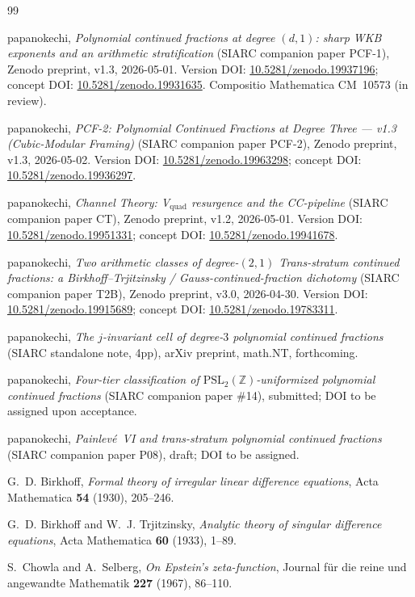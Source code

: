 \documentclass[11pt,a4paper]{article}
\theoremstyle{definition}
\theoremstyle{remark}
\newcommand{\PSLZ}{\mathrm{PSL}_2(\mathbb{Z})}
\begin{document}
\begin{thebibliography}{99}

papanokechi,
\emph{Polynomial continued fractions at degree $(d,1)$: sharp WKB exponents and an arithmetic stratification}
(SIARC companion paper PCF-1),
Zenodo preprint, v1.3, 2026-05-01.
Version DOI: \href{https://doi.org/10.5281/zenodo.19937196}{10.5281/zenodo.19937196};
concept DOI: \href{https://doi.org/10.5281/zenodo.19931635}{10.5281/zenodo.19931635}.
Compositio Mathematica CM~10573 (in review).

papanokechi,
\emph{PCF-2: Polynomial Continued Fractions at Degree Three --- v1.3 (Cubic-Modular Framing)}
(SIARC companion paper PCF-2),
Zenodo preprint, v1.3, 2026-05-02.
Version DOI: \href{https://doi.org/10.5281/zenodo.19963298}{10.5281/zenodo.19963298};
concept DOI: \href{https://doi.org/10.5281/zenodo.19936297}{10.5281/zenodo.19936297}.

papanokechi,
\emph{Channel Theory: V$_{\mathrm{quad}}$ resurgence and the CC-pipeline}
(SIARC companion paper CT),
Zenodo preprint, v1.2, 2026-05-01.
Version DOI: \href{https://doi.org/10.5281/zenodo.19951331}{10.5281/zenodo.19951331};
concept DOI: \href{https://doi.org/10.5281/zenodo.19941678}{10.5281/zenodo.19941678}.

papanokechi,
\emph{Two arithmetic classes of degree-$(2,1)$ Trans-stratum continued fractions: a Birkhoff--Trjitzinsky / Gauss-continued-fraction dichotomy}
(SIARC companion paper T2B),
Zenodo preprint, v3.0, 2026-04-30.
Version DOI: \href{https://doi.org/10.5281/zenodo.19915689}{10.5281/zenodo.19915689};
concept DOI: \href{https://doi.org/10.5281/zenodo.19783311}{10.5281/zenodo.19783311}.

papanokechi,
\emph{The $j$-invariant cell of degree-$3$ polynomial continued fractions} (SIARC standalone note, 4pp),
arXiv preprint, math.NT, forthcoming.

papanokechi,
\emph{Four-tier classification of $\PSLZ$-uniformized polynomial continued fractions}
(SIARC companion paper \#14),
submitted; DOI to be assigned upon acceptance.

papanokechi,
\emph{Painlev\'e~VI and trans-stratum polynomial continued fractions}
(SIARC companion paper P08),
draft; DOI to be assigned.

G.~D. Birkhoff,
\emph{Formal theory of irregular linear difference equations},
Acta Mathematica \textbf{54} (1930), 205--246.

G.~D. Birkhoff and W.~J. Trjitzinsky,
\emph{Analytic theory of singular difference equations},
Acta Mathematica \textbf{60} (1933), 1--89.

S.~Chowla and A.~Selberg,
\emph{On Epstein's zeta-function},
Journal f\"ur die reine und angewandte Mathematik \textbf{227} (1967), 86--110.

\end{thebibliography}
\end{document}
